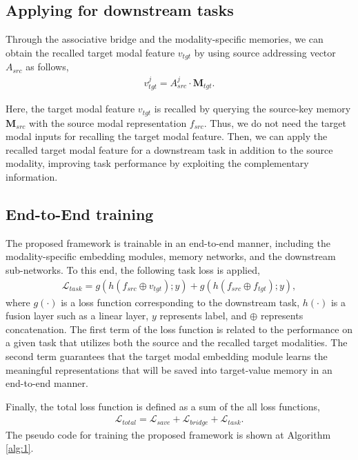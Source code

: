 \documentclass[10pt,twocolumn,letterpaper]{article}
\begin{document}
\subsection{Applying for downstream tasks}
\vspace{-0.11cm}
Through the associative bridge and the modality-specific memories, we can obtain the recalled target modal feature $v_{tgt}$ by using source addressing vector $A_{src}$ as follows,
\begin{align}
\label{eq:3}
    v^j_{tgt} = A^j_{src} \cdot \mathbf{M}_{tgt}.
\end{align}

Here, the target modal feature $v_{tgt}$ is recalled by querying the source-key memory $\mathbf{M}_{src}$ with the source modal representation $f_{src}$. Thus, we do not need the target modal inputs for recalling the target modal feature. Then, we can apply the recalled target modal feature for a downstream task in addition to the source modality, improving task performance by exploiting the complementary information.

\subsection{End-to-End training}
The proposed framework is trainable in an end-to-end manner, including the modality-specific embedding modules, memory networks, and the downstream sub-networks. To this end, the following task loss is applied,
\begin{align}
\label{eq:7}
    \mathcal{L}_{task} = g(h(f_{src}\oplus v_{tgt});y) + g(h(f_{src}\oplus f_{tgt});y),
\end{align}
where $g(\cdot)$ is a loss function corresponding to the downstream task, $h(\cdot)$ is a fusion layer such as a linear layer, $y$ represents label, and $\oplus$ represents concatenation. The first term of the loss function is related to the performance on a given task that utilizes both the source and the recalled target modalities. The second term guarantees that the target modal embedding module learns the meaningful representations that will be saved into target-value memory in an end-to-end manner.

Finally, the total loss function is defined as a sum of the all loss functions,
\begin{align}
\label{eq:8}
    \mathcal{L}_{total} = \mathcal{L}_{save} + \mathcal{L}_{bridge} + \mathcal{L}_{task}.
\end{align}
The pseudo code for training the proposed framework is shown at Algorithm \ref{alg:1}.
\end{document}
